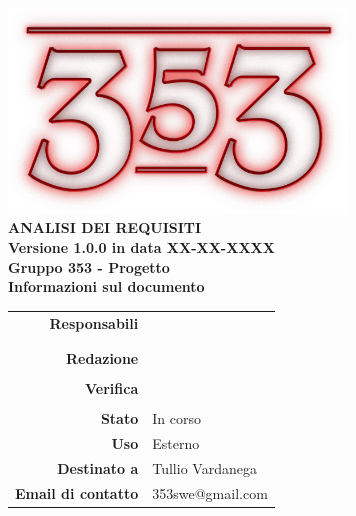 \documentclass[openany, a4paper, 12pt]{report}
\begin{document}
\begin{titlepage}
	\centering
	\vfill
	{
		\bfseries
		\vskip2cm
		\includegraphics[width=9cm]{../../common/images/logo.png} \\
		\vfill
		\Huge{ANALISI DEI REQUISITI}\\
		\vfill
		\Large Versione 1.0.0 in data XX-XX-XXXX\\ %
		\large Gruppo 353 - Progetto \progetto \\
		\vfill
\normalsize Informazioni sul documento\\
\begin{table}[htbp]
	\centering
	\renewcommand\arraystretch{1.2}
	\begin{tabular}{r|l}
		\hline
		\textbf{Responsabili}	& \Elena \\
								& \Valentina\\
								& \Mirco\\
		
		\textbf{Redazione} 		& \Riccardo\\
								& \Gianluca\\
		
		\textbf{Verifica} 		& \Parwinder\\
								& \Davide\\
						
		\textbf{Stato} 			& In corso\\
		\textbf{Uso}			& Esterno\\
		\textbf{Destinato a}   	& Tullio Vardanega\\
		
						
		\textbf{Email di contatto}	& 353swe@gmail.com
	\end{tabular}
\end{table}
		\vfill
	}    
\end{titlepage}

\tableofcontents

\listoffigures

\listoftables

\newpage
{}




 
\end{document}
